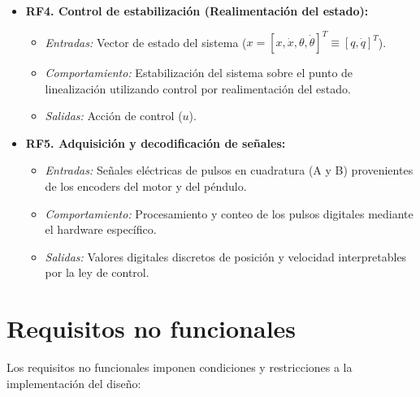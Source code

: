 \documentclass[11pt,fleqn]{book} %
\begin{document}
\begin{itemize}
	\item \textbf{RF4. Control de estabilización (Realimentación del estado):} 
	\begin{itemize}
		\item \textit{Entradas:} Vector de estado del sistema ($x = [x, \dot{x}, \theta, \dot{\theta}]^T \equiv [q, \dot{q}]^T$). 
		\item \textit{Comportamiento:} Estabilización del sistema sobre el punto de linealización utilizando control por realimentación del estado. 
		\item \textit{Salidas:}  Acción de control ($u$).
	\end{itemize}
	
	\item \textbf{RF5. Adquisición y decodificación de señales:} 
	\begin{itemize}
		\item \textit{Entradas:} Señales eléctricas de pulsos en cuadratura (A y B) provenientes de los encoders del motor y del péndulo.
		\item \textit{Comportamiento:} Procesamiento y conteo de los pulsos digitales mediante el hardware específico.
		\item \textit{Salidas:} Valores digitales discretos de posición y velocidad interpretables por la ley de control.
	\end{itemize}
\end{itemize}

\section{Requisitos no funcionales}
Los requisitos no funcionales imponen condiciones y restricciones a la implementación del diseño:
\end{document}
